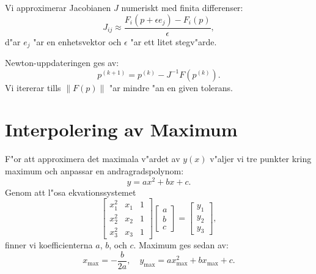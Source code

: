 \documentclass[12pt, letterpaper]{article}
\begin{document}
Vi approximerar Jacobianen $J$ numeriskt med finita differenser:
\begin{equation}
    J_{ij} \approx \frac{F_i(p + \epsilon e_j) - F_i(p)}{\epsilon},
\end{equation}
d"ar $e_j$ "ar en enhetsvektor och $\epsilon$ "ar ett litet stegv"arde.

Newton-uppdateringen ges av:
\begin{equation}
    p^{(k+1)} = p^{(k)} - J^{-1} F(p^{(k)}).
\end{equation}
Vi itererar tills $\|F(p)\|$ "ar mindre "an en given tolerans.

\section{Interpolering av Maximum}
F"or att approximera det maximala v"ardet av $y(x)$ v"aljer vi tre punkter kring maximum och anpassar en andragradspolynom:
\begin{equation}
    y = ax^2 + bx + c.
\end{equation}
Genom att l"osa ekvationssystemet
\begin{equation}
    \begin{bmatrix}
        x_1^2 & x_1 & 1 \\
        x_2^2 & x_2 & 1 \\
        x_3^2 & x_3 & 1
    \end{bmatrix}
    \begin{bmatrix} a \\ b \\ c \end{bmatrix} =
    \begin{bmatrix} y_1 \\ y_2 \\ y_3 \end{bmatrix},
\end{equation}
finner vi koefficienterna $a$, $b$, och $c$. Maximum ges sedan av:
\begin{equation}
    x_{\text{max}} = -\frac{b}{2a}, \quad y_{\text{max}} = a x_{\text{max}}^2 + b x_{\text{max}} + c.
\end{equation}
\end{document}
